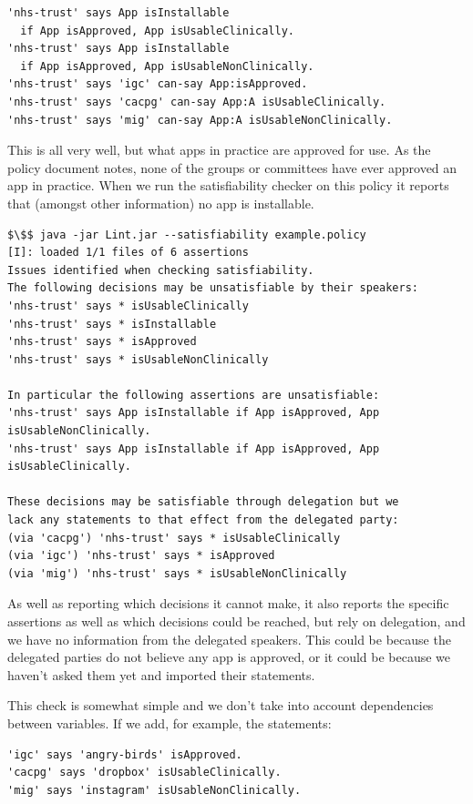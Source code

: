\documentclass[thesis.tex]{subfiles}
\begin{document}
\begin{lstlisting}
'nhs-trust' says App isInstallable
  if App isApproved, App isUsableClinically.
'nhs-trust' says App isInstallable
  if App isApproved, App isUsableNonClinically.
'nhs-trust' says 'igc' can-say App:isApproved.
'nhs-trust' says 'cacpg' can-say App:A isUsableClinically.
'nhs-trust' says 'mig' can-say App:A isUsableNonClinically.
\end{lstlisting}

This is all very well, but what apps in practice are approved for use.
As the policy document notes, none of the groups or committees have ever
approved an app in practice.  When we run the satisfiability checker on this policy
it reports that (amongst other information) no app is installable.

\begin{lstlisting}
$\$$ java -jar Lint.jar --satisfiability example.policy
[I]: loaded 1/1 files of 6 assertions
Issues identified when checking satisfiability.
The following decisions may be unsatisfiable by their speakers:
'nhs-trust' says * isUsableClinically
'nhs-trust' says * isInstallable
'nhs-trust' says * isApproved
'nhs-trust' says * isUsableNonClinically

In particular the following assertions are unsatisfiable:
'nhs-trust' says App isInstallable if App isApproved, App isUsableNonClinically.
'nhs-trust' says App isInstallable if App isApproved, App isUsableClinically.

These decisions may be satisfiable through delegation but we
lack any statements to that effect from the delegated party:
(via 'cacpg') 'nhs-trust' says * isUsableClinically
(via 'igc') 'nhs-trust' says * isApproved
(via 'mig') 'nhs-trust' says * isUsableNonClinically
\end{lstlisting}

As well as reporting which decisions it cannot make, it also reports the
specific assertions as well as which decisions could be reached, but rely on
delegation, and we have no information from the delegated speakers.  This could
be because the delegated parties do not believe any app is approved, or it could
be because we haven't asked them yet and imported their statements.

This check is somewhat simple and we don't take into account dependencies
between variables.  If we add, for example, the statements:

\begin{lstlisting}
'igc' says 'angry-birds' isApproved.
'cacpg' says 'dropbox' isUsableClinically.
'mig' says 'instagram' isUsableNonClinically.
\end{lstlisting}
\end{document}
